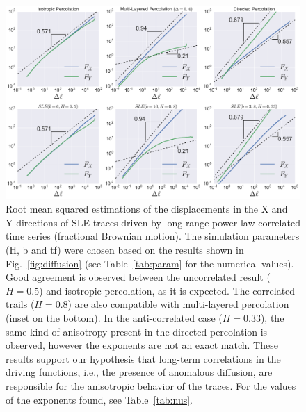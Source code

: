 \begin{figure}
\begin{center}
    \includegraphics[width=\textwidth]{chapters/ch6-asle/figs/spacescaling}
\end{center}
\caption{Root mean squared estimations of the displacements in the X and
    Y-directions of SLE traces driven by long-range power-law correlated time
    series (fractional Brownian motion). The simulation parameters (H, b and
    tf) were chosen based on the results shown in Fig.~\ref{fig:diffusion} (see
    Table~\ref{tab:param} for the numerical values). Good agreement is
    observed between the uncorrelated result ($H=0.5$) and isotropic percolation,
    as it is expected. The correlated trails ($H=0.8$) are also compatible with
    multi-layered percolation (inset on the bottom). In the anti-correlated
    case ($H=0.33$), the same kind of anisotropy present in the directed
    percolation is observed, however the exponents are not an exact match.
    These results support our hypothesis that long-term correlations in the
    driving functions, i.e., the presence of anomalous diffusion, are
    responsible for the anisotropic behavior of the traces. For the values of
    the exponents found, see Table~\ref{tab:nus}.}
\label{fig:spacescaling}
\end{figure}


